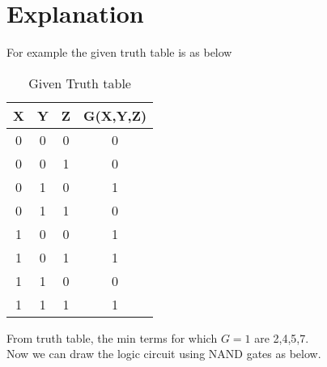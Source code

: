 \documentclass{article}
\begin{document}
\section{Explanation}
For example the given truth table is as below\\
\begin{table} [h!]
    \centering
    \begin{tabular}{ | c | c | c | c | }
    \hline
    X & Y & Z & G(X,Y,Z) \\
    \hline
    0 & 0 & 0 & 0 \\
    0 & 0 & 1 & 0 \\
    0 & 1 & 0 & 1 \\
    0 & 1 & 1 & 0 \\
    1 & 0 & 0 & 1 \\
    1 & 0 & 1 & 1 \\
    1 & 1 & 0 & 0 \\
    1 & 1 & 1 & 1 \\
     \hline
\end{tabular}
\caption{Given Truth table}
\label{Table1}
\end{table}
\newline
From truth table, the min terms for which $G=1$ are 2,4,5,7.\\
Now we can draw the logic circuit using NAND gates as below.\\\\
\end{document}
